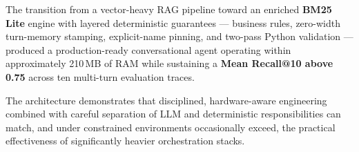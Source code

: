 \documentclass[10pt,twocolumn,letterpaper]{article}
\begin{document}
The transition from a vector-heavy RAG pipeline toward an enriched
\textbf{BM25 Lite} engine with layered deterministic guarantees ---
business rules, zero-width turn-memory stamping, explicit-name pinning,
and two-pass Python validation --- produced a production-ready
conversational agent operating within approximately 210\,MB of RAM
while sustaining a \textbf{Mean Recall@10 above 0.75} across
ten multi-turn evaluation traces.

The architecture demonstrates that disciplined, hardware-aware
engineering combined with careful separation of LLM and deterministic
responsibilities can match, and under constrained environments
occasionally exceed, the practical effectiveness of significantly
heavier orchestration stacks.
\end{document}
